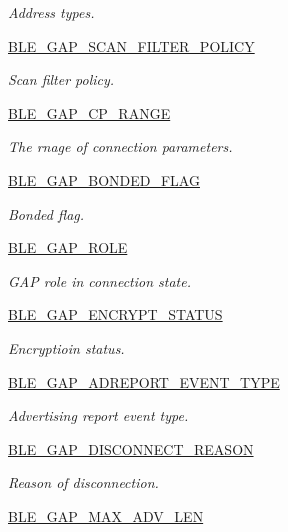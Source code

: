 \begin{DoxyCompactItemize}
\begin{DoxyCompactList}\small\item\em Address types. \end{DoxyCompactList}\item 
\hyperlink{group___b_l_e___g_a_p___s_c_a_n___f_i_l_t_e_r___p_o_l_i_c_y}{B\+L\+E\+\_\+\+G\+A\+P\+\_\+\+S\+C\+A\+N\+\_\+\+F\+I\+L\+T\+E\+R\+\_\+\+P\+O\+L\+I\+CY}
\begin{DoxyCompactList}\small\item\em Scan filter policy. \end{DoxyCompactList}\item 
\hyperlink{group___b_l_e___g_a_p___c_p___r_a_n_g_e}{B\+L\+E\+\_\+\+G\+A\+P\+\_\+\+C\+P\+\_\+\+R\+A\+N\+GE}
\begin{DoxyCompactList}\small\item\em The rnage of connection parameters. \end{DoxyCompactList}\item 
\hyperlink{group___b_l_e___g_a_p___b_o_n_d_e_d___f_l_a_g}{B\+L\+E\+\_\+\+G\+A\+P\+\_\+\+B\+O\+N\+D\+E\+D\+\_\+\+F\+L\+AG}
\begin{DoxyCompactList}\small\item\em Bonded flag. \end{DoxyCompactList}\item 
\hyperlink{group___b_l_e___g_a_p___r_o_l_e}{B\+L\+E\+\_\+\+G\+A\+P\+\_\+\+R\+O\+LE}
\begin{DoxyCompactList}\small\item\em G\+AP role in connection state. \end{DoxyCompactList}\item 
\hyperlink{group___b_l_e___g_a_p___e_n_c_r_y_p_t___s_t_a_t_u_s}{B\+L\+E\+\_\+\+G\+A\+P\+\_\+\+E\+N\+C\+R\+Y\+P\+T\+\_\+\+S\+T\+A\+T\+US}
\begin{DoxyCompactList}\small\item\em Encryptioin status. \end{DoxyCompactList}\item 
\hyperlink{group___b_l_e___g_a_p___a_d_r_e_p_o_r_t___e_v_e_n_t___t_y_p_e}{B\+L\+E\+\_\+\+G\+A\+P\+\_\+\+A\+D\+R\+E\+P\+O\+R\+T\+\_\+\+E\+V\+E\+N\+T\+\_\+\+T\+Y\+PE}
\begin{DoxyCompactList}\small\item\em Advertising report event type. \end{DoxyCompactList}\item 
\hyperlink{group___b_l_e___g_a_p___d_i_s_c_o_n_n_e_c_t___r_e_a_s_o_n}{B\+L\+E\+\_\+\+G\+A\+P\+\_\+\+D\+I\+S\+C\+O\+N\+N\+E\+C\+T\+\_\+\+R\+E\+A\+S\+ON}
\begin{DoxyCompactList}\small\item\em Reason of disconnection. \end{DoxyCompactList}\item 
\hyperlink{group___b_l_e___g_a_p___m_a_x___a_d_v___l_e_n}{B\+L\+E\+\_\+\+G\+A\+P\+\_\+\+M\+A\+X\+\_\+\+A\+D\+V\+\_\+\+L\+EN}
\end{DoxyCompactItemize}
